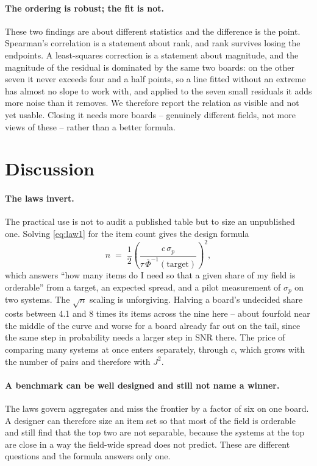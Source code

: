\documentclass[10pt]{article}
\begin{document}
\paragraph{The ordering is robust; the fit is not.} These two findings are
about different statistics and the difference is the point. Spearman's
correlation is a statement about rank, and rank survives losing the
endpoints. A least-squares correction is a statement about magnitude, and
the magnitude of the residual is dominated by the same two boards: on the
other seven it never exceeds four and a half points, so a line fitted
without an extreme has almost no slope to work with, and applied to the
seven small residuals it adds more noise than it removes. We therefore
report the relation as visible and not yet usable. Closing it needs more
boards -- genuinely different fields, not more views of these -- rather
than a better formula.

\section{Discussion}

\paragraph{The laws invert.} The practical use is not to audit a published
table but to size an unpublished one. Solving \eqref{eq:law1} for the item
count gives the design formula
\begin{equation}
n \;=\; \frac{1}{2}\left(\frac{c\,\sigma_p}{\tau\,\bar\Phi^{-1}(\text{target})}\right)^{\!2},
\end{equation}
which answers ``how many items do I need so that a given share of my field
is orderable'' from a target, an expected spread, and a pilot measurement of
$\sigma_p$ on two systems. The $\sqrt{n}$ scaling is unforgiving. Halving a
board's undecided share costs between 4.1 and 8 times its items
across the nine here -- about fourfold near the middle of the curve and
worse for a board already far out on the tail, since the same step in
probability needs a larger step in $\mathrm{SNR}$ there. The price of
comparing many systems at once enters separately, through $c$, which grows
with the number of pairs and therefore with $J^2$.

\paragraph{A benchmark can be well designed and still not name a winner.}
The laws govern aggregates and miss the frontier by a factor of six on one
board. A designer can therefore size an item set so that most of the field
is orderable and still find that the top two are not separable, because the
systems at the top are close in a way the field-wide spread does not
predict. These are different questions and the formula answers only one.
\end{document}
